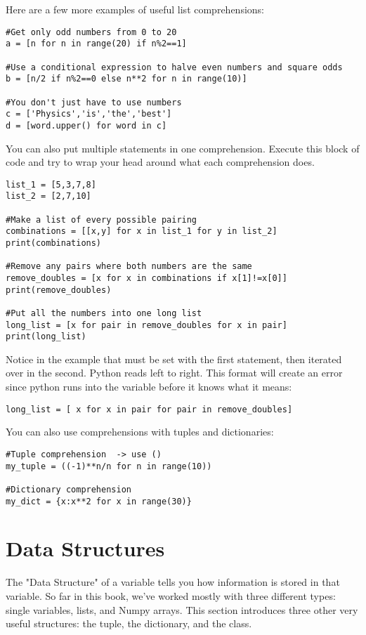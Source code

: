 Here are a few more examples of useful list comprehensions:
\begin{Verbatim}
#Get only odd numbers from 0 to 20
a = [n for n in range(20) if n%2==1]

#Use a conditional expression to halve even numbers and square odds
b = [n/2 if n%2==0 else n**2 for n in range(10)]

#You don't just have to use numbers
c = ['Physics','is','the','best']
d = [word.upper() for word in c]
\end{Verbatim}

You can also put multiple  statements in one comprehension.  Execute this block of code and try to wrap your head around what each comprehension does.
\begin{Verbatim}
list_1 = [5,3,7,8]
list_2 = [2,7,10]

#Make a list of every possible pairing
combinations = [[x,y] for x in list_1 for y in list_2]
print(combinations)

#Remove any pairs where both numbers are the same
remove_doubles = [x for x in combinations if x[1]!=x[0]]
print(remove_doubles)

#Put all the numbers into one long list
long_list = [x for pair in remove_doubles for x in pair]
print(long_list)
\end{Verbatim}
Notice in the  example that  must be set with the first  statement, then iterated over in the second. Python reads left to right.  This format will create an error since python runs into the variable  before it knows what it means:
\begin{Verbatim}
long_list = [ x for x in pair for pair in remove_doubles]
\end{Verbatim}


You can also use comprehensions with tuples and dictionaries:
\begin{Verbatim}
#Tuple comprehension  -> use ()
my_tuple = ((-1)**n/n for n in range(10))

#Dictionary comprehension
my_dict = {x:x**2 for x in range(30)}
\end{Verbatim}




\section{Data Structures}\label{sec:datastruct}
The "Data Structure" of a variable tells you how information is stored in that variable.  So far in this book, we've worked mostly with three different types: single variables, lists, and Numpy arrays. This section introduces three other very useful structures: the tuple, the dictionary, and the class.


